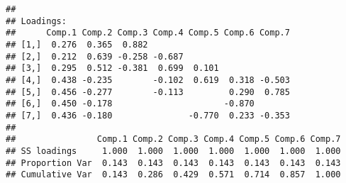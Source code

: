 \documentclass[]{article}
\newenvironment{Shaded}{\begin{snugshade}}{\end{snugshade}}
\newcommand{\DataTypeTok}[1]{\textcolor[rgb]{0.13,0.29,0.53}{#1}}
\newcommand{\DecValTok}[1]{\textcolor[rgb]{0.00,0.00,0.81}{#1}}
\newcommand{\FloatTok}[1]{\textcolor[rgb]{0.00,0.00,0.81}{#1}}
\newcommand{\KeywordTok}[1]{\textcolor[rgb]{0.13,0.29,0.53}{\textbf{#1}}}
\newcommand{\NormalTok}[1]{#1}
\newcommand{\OperatorTok}[1]{\textcolor[rgb]{0.81,0.36,0.00}{\textbf{#1}}}
\begin{document}
\begin{Shaded}
\end{Shaded}

\begin{Shaded}
\end{Shaded}

\begin{verbatim}
## 
## Loadings:
##      Comp.1 Comp.2 Comp.3 Comp.4 Comp.5 Comp.6 Comp.7
## [1,]  0.276  0.365  0.882                            
## [2,]  0.212  0.639 -0.258 -0.687                     
## [3,]  0.295  0.512 -0.381  0.699  0.101              
## [4,]  0.438 -0.235        -0.102  0.619  0.318 -0.503
## [5,]  0.456 -0.277        -0.113         0.290  0.785
## [6,]  0.450 -0.178                      -0.870       
## [7,]  0.436 -0.180               -0.770  0.233 -0.353
## 
##                Comp.1 Comp.2 Comp.3 Comp.4 Comp.5 Comp.6 Comp.7
## SS loadings     1.000  1.000  1.000  1.000  1.000  1.000  1.000
## Proportion Var  0.143  0.143  0.143  0.143  0.143  0.143  0.143
## Cumulative Var  0.143  0.286  0.429  0.571  0.714  0.857  1.000
\end{verbatim}
\end{document}
